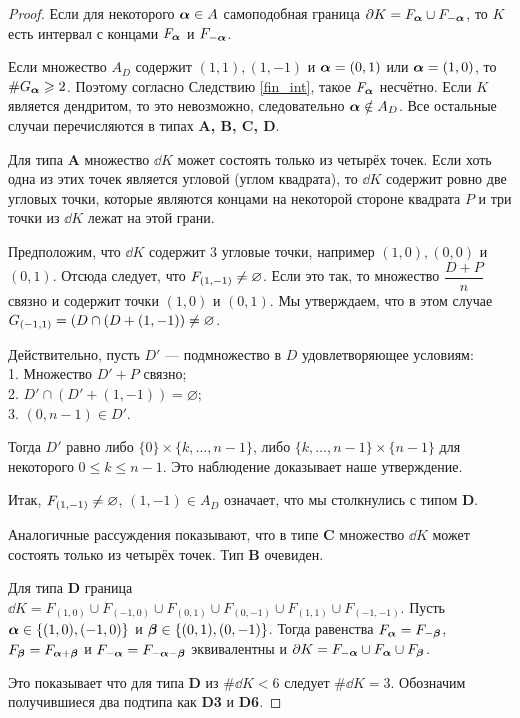\begin{proof}
Если для некоторого ${\bm{\alpha}}\in A$ самоподобная граница $\partial K=F_{\bm{\alpha}}\cup F_{-{\bm{\alpha}}}$, то $K$  есть интервал с концами $F_{\bm{\alpha}}$ и $ F_{-{\bm{\alpha}}}$.
 
Если множество $A_D$ содержит $(1,1),(1,-1)$ и ${\bm{\alpha}}=(0,1)$ или ${\bm{\alpha}}=(1,0)$, то $\#G_{\bm{\alpha}}\geqslant 2$.
Поэтому согласно Следствию \ref{fin_int}, такое $F_{\bm{\alpha}}$ несчётно.
Если $K$  является дендритом, то это невозможно, следовательно ${\bm{\alpha}}\notin A_D$. 
Все остальные случаи перечисляются в типах {\bf A, B, C, D}.

Для типа {\bf A} множество $\dd K$ может состоять только из четырёх точек. 
Если хоть одна из этих точек является угловой (углом квадрата), то $\dd K$ содержит ровно две угловых точки, которые являются концами на некоторой стороне квадрата $P$ и три точки из $\dd K$ лежат на этой грани.

Предположим, что $\dd K$ содержит $3$ угловые точки, например $(1,0),(0,0)$ и $(0,1)$.
Отсюда следует, что $F_{(1,-1)}\neq\varnothing$.
Если это так, то множество $\dfrac{D+P}{n}$ связно и содержит точки $(1,0)$ и $(0,1)$. 
Мы утверждаем, что в этом случае $G_{(-1,1)}=(D\cap (D+(1,-1))\neq\varnothing$.
 
Действительно, пусть $D'$ --- подмножество в $D$ удовлетворяющее условиям:\\
1. Множество $D'+P$ связно;\\
2. $D'\cap (D'+(1,-1))=\varnothing$;\\
3. $(0,n-1)\in D'$. 

Тогда $D'$ равно либо $\{0\}\times\{k,\ldots,n-1\}$, либо $\{k,\ldots,n-1\}\times\{n-1\}$ для некоторого $0\leq k\leq n-1$.
Это наблюдение доказывает наше утверждение.
 
Итак, $F_{(1,-1)}\neq\varnothing$, $(1,-1)\in A_D$ означает, что мы столкнулись с типом {\bf D}. 
 
Аналогичные рассуждения показывают, что в типе {\bf C} множество $\dd K$ может состоять только из четырёх точек. 
Тип {\bf B} очевиден.

Для типа {\bf D} граница $\dd K=F_{(1,0)}\cup F_{(-1,0)}\cup F_{(0,1)}\cup F_{(0,-1)}\cup F_{(1,1)}\cup F_{(-1,-1)}$.
Пусть ${\bm{\alpha}}\in\{(1,0),(-1,0)\}$ и ${\bm{\beta}}\in\{(0,1),(0,-1)\}$. 
Тогда равенства $F_{\bm{\alpha}}=F_{-{\bm{\beta}}}$, $F_{{\bm{\beta}}}=F_{{\bm{\alpha}}+{\bm{\beta}}}$ и $F_{-{\bm{\alpha}}}=F_{-{\bm{\alpha}}-{\bm{\beta}}}$ эквивалентны и $\partial K=F_{-{\bm{\alpha}}}\cup F_{\bm{\alpha}}\cup F_{\bm{\beta}}$. 

Это показывает что для типа {\bf D} из $\#\dd K<6$ следует $\#\dd K=3$. 
Обозначим получившиеся два подтипа как {\bf D3} и {\bf D6}.
\end{proof}

